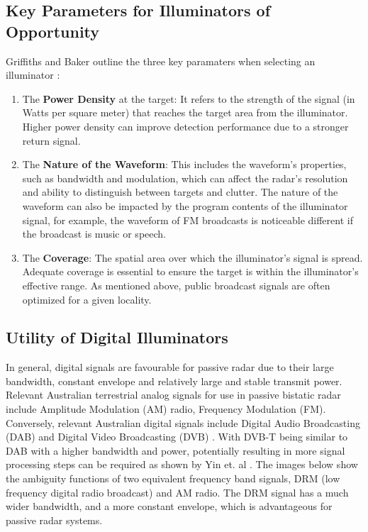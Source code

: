 \subsection{Key Parameters for Illuminators of Opportunity \label{sec:illuminatorParameters}}
Griffiths and Baker outline the three key paramaters when selecting an illuminator \cite{INTRO2017}:
\begin{enumerate}[label=\arabic*.]
    \item The \textbf{Power Density} at the target: It refers to the strength of the signal (in Watts per square meter) that reaches the target area from the illuminator. Higher power density can improve detection performance due to a stronger return signal.
    \item The \textbf{Nature of the Waveform}: This includes the waveform's properties, such as bandwidth and modulation, which can affect the radar's resolution and ability to distinguish between targets and clutter. The nature of the waveform can also be impacted by the program contents of the illuminator signal, for example, the waveform of FM broadcasts is noticeable different if the broadcast is music or speech.
    \item The \textbf{Coverage}: The spatial area over which the illuminator's signal is spread. Adequate coverage is essential to ensure the target is within the illuminator's effective range. As mentioned above, public broadcast signals are often optimized for a given locality.
\end{enumerate}

\subsection{Utility of Digital Illuminators \label{sec:digitalIlluminators}}
In general, digital signals are favourable for passive radar due to their large bandwidth, constant envelope and relatively large and stable transmit power. Relevant Australian terrestrial analog signals for use in passive bistatic radar include Amplitude Modulation (AM) radio, Frequency Modulation (FM). Conversely, relevant Australian digital signals include Digital Audio Broadcasting (DAB) and Digital Video Broadcasting (DVB) \cite{DABfeatures}. With DVB-T being similar to DAB with a higher bandwidth and power, potentially resulting in more signal processing steps can be required as shown by Yin et. al \cite{DVBnoise}. The images below show the ambiguity functions of two equivalent frequency band signals, DRM (low frequency digital radio broadcast) and AM radio. The DRM signal has a much wider bandwidth, and a more constant envelope, which is advantageous for passive radar systems.


